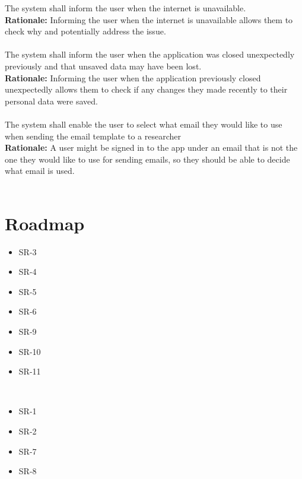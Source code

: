 \documentclass{article}
\begin{document}
The system shall inform the user when the internet is unavailable. \\
\textbf{Rationale:}
Informing the user when the internet is unavailable allows them to check why and potentially address the issue. \\~\\

The system shall inform the user when the application was closed unexpectedly previously and that unsaved data may have been lost. \\
\textbf{Rationale:}
Informing the user when the application previously closed unexpectedly allows them to check if any changes they made recently to their personal data were saved. \\~\\

The system shall enable the user to select what email they would like to use when sending the email template to a researcher\\
\textbf{Rationale:}
A user might be signed in to the app under an email that is not the one they would like to use for sending emails, so they should be
able to decide what email is used.\\~\\

\section{Roadmap}

\begin{itemize}
  \item SR-3
  \item SR-4
  \item SR-5
  \item SR-6
  \item SR-9
  \item SR-10
  \item SR-11
\end{itemize}

\\

\begin{itemize}
  \item SR-1
  \item SR-2
  \item SR-7
  \item SR-8
\end{itemize}
\end{document}

